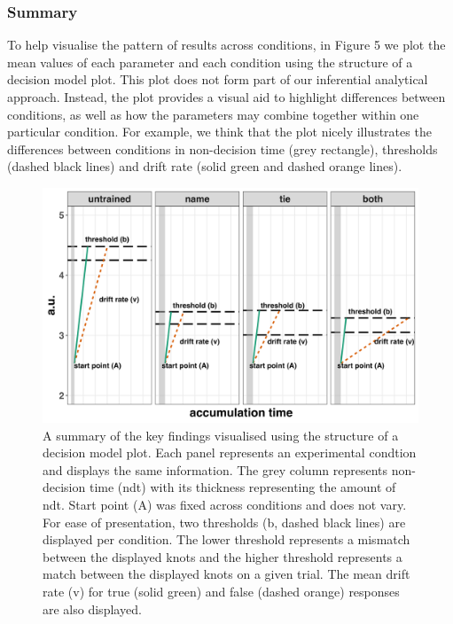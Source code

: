\documentclass[
  man, donotrepeattitle,floatsintext]{apa6}
\begin{document}
\subsubsection{Summary}\label{summary}

To help visualise the pattern of results across conditions, in Figure 5 we plot the mean values of each parameter and each condition using the structure of a decision model plot. This plot does not form part of our inferential analytical approach. Instead, the plot provides a visual aid to highlight differences between conditions, as well as how the parameters may combine together within one particular condition. For example, we think that the plot nicely illustrates the differences between conditions in non-decision time (grey rectangle), thresholds (dashed black lines) and drift rate (solid green and dashed orange lines).



\begin{figure}[H]

{\centering \includegraphics[height=0.67\textheight,]{../figures/lba_summary} 

}

\caption{A summary of the key findings visualised using the structure of a decision model plot. Each panel represents an experimental condtion and displays the same information. The grey column represents non-decision time (ndt) with its thickness representing the amount of ndt. Start point (A) was fixed across conditions and does not vary. For ease of presentation, two thresholds (b, dashed black lines) are displayed per condition. The lower threshold represents a mismatch between the displayed knots and the higher threshold represents a match between the displayed knots on a given trial. The mean drift rate (v) for true (solid green) and false (dashed orange) responses are also displayed.}\label{fig:lba-summary-plot}
\end{figure}
\end{document}
